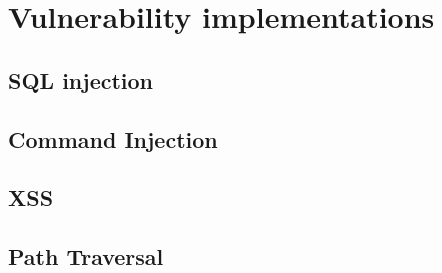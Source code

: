\chapter{Vulnerability implementations}

\section{SQL injection}\label{appendix:sqli}


\section{Command Injection}\label{appendix:command_injection}


\section{XSS}\label{appendix:xss}


\section{Path Traversal}\label{appendix:path_traversal}




